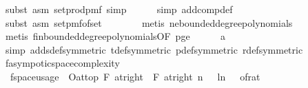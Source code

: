 \begin{isabellebody}
\ {\isacharparenleft}{\kern0pt}subst\ {\isacharparenleft}{\kern0pt}asm{\isacharparenright}{\kern0pt}\ set{\isacharunderscore}{\kern0pt}prod{\isacharunderscore}{\kern0pt}pmf{\isacharcomma}{\kern0pt}\ simp{\isacharparenright}{\kern0pt}\isanewline
\ \ \ \ \isamarkupfalse%
\ {\isacharparenleft}{\kern0pt}simp\ add{\isacharcolon}{\kern0pt}comp{\isacharunderscore}{\kern0pt}def{\isacharparenright}{\kern0pt}\isanewline
\ \ \ \ \isamarkupfalse%
\ {\isacharparenleft}{\kern0pt}subst\ {\isacharparenleft}{\kern0pt}asm{\isacharparenright}{\kern0pt}\ set{\isacharunderscore}{\kern0pt}pmf{\isacharunderscore}{\kern0pt}of{\isacharunderscore}{\kern0pt}set{\isacharparenright}{\kern0pt}\isanewline
\ \ \ \ \ \ \isamarkupfalse%
\ {\isacharparenleft}{\kern0pt}metis\ ne{\isacharunderscore}{\kern0pt}bounded{\isacharunderscore}{\kern0pt}degree{\isacharunderscore}{\kern0pt}polynomials{\isacharparenright}{\kern0pt}\isanewline
\ \ \ \ \ \isamarkupfalse%
\ {\isacharparenleft}{\kern0pt}metis\ fin{\isacharunderscore}{\kern0pt}bounded{\isacharunderscore}{\kern0pt}degree{\isacharunderscore}{\kern0pt}polynomials{\isacharbrackleft}{\kern0pt}OF\ p{\isacharunderscore}{\kern0pt}ge{\isacharunderscore}{\kern0pt}{}{\isacharbrackright}{\kern0pt}{\isacharparenright}{\kern0pt}\isanewline
\ \ \ \ \isamarkupfalse%
\ a\isanewline
\ \ \ \ \isamarkupfalse%
\ {\isacharparenleft}{\kern0pt}simp\ add{\isacharcolon}{\kern0pt}s{\isacharunderscore}{\kern0pt}def{\isacharbrackleft}{\kern0pt}symmetric{\isacharbrackright}{\kern0pt}\ t{\isacharunderscore}{\kern0pt}def{\isacharbrackleft}{\kern0pt}symmetric{\isacharbrackright}{\kern0pt}\ p{\isacharunderscore}{\kern0pt}def{\isacharbrackleft}{\kern0pt}symmetric{\isacharbrackright}{\kern0pt}\ r{\isacharunderscore}{\kern0pt}def{\isacharbrackleft}{\kern0pt}symmetric{\isacharbrackright}{\kern0pt}{\isacharparenright}{\kern0pt}\isanewline
{}\isamarkupfalse%
%
\endisatagproof
{\isafoldproof}%
%
\isadelimproof
\isanewline
%
\endisadelimproof
\isanewline
{}\isamarkupfalse%
\ f{}{\isacharunderscore}{\kern0pt}asympotic{\isacharunderscore}{\kern0pt}space{\isacharunderscore}{\kern0pt}complexity{\isacharcolon}{\kern0pt}\isanewline
\ \ {\isachardoublequoteopen}f{}{\isacharunderscore}{\kern0pt}space{\isacharunderscore}{\kern0pt}usage\ {\isasymin}\ O{\isacharbrackleft}{\kern0pt}at{\isacharunderscore}{\kern0pt}top\ {\isasymtimes}\isactrlsub F\ at{\isacharunderscore}{\kern0pt}right\ {}\ {\isasymtimes}\isactrlsub F\ at{\isacharunderscore}{\kern0pt}right\ {}{\isacharbrackright}{\kern0pt}{\isacharparenleft}{\kern0pt}{\isasymlambda}{\isacharparenleft}{\kern0pt}n{\isacharcomma}{\kern0pt}\ {\isasymepsilon}{\isacharcomma}{\kern0pt}\ {\isasymdelta}{\isacharparenright}{\kern0pt}{\isachardot}{\kern0pt}\ ln\ {\isacharparenleft}{\kern0pt}{}\ {\isacharslash}{\kern0pt}\ of{\isacharunderscore}{\kern0pt}rat\ {\isasymepsilon}{\isacharparenright}{\kern0pt}\ {\isacharasterisk}{\kern0pt}\ \isanewline

\end{isabellebody}
